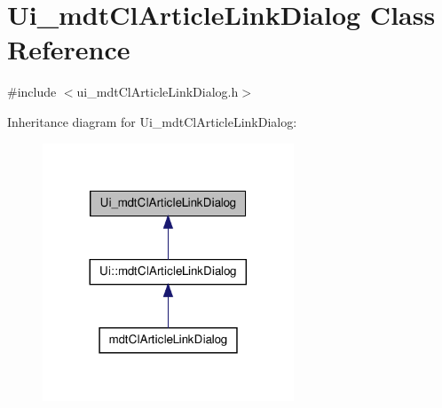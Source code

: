 \hypertarget{class_ui__mdt_cl_article_link_dialog}{\section{Ui\-\_\-mdt\-Cl\-Article\-Link\-Dialog Class Reference}
\label{class_ui__mdt_cl_article_link_dialog}
}


{\ttfamily \#include $<$ui\-\_\-mdt\-Cl\-Article\-Link\-Dialog.\-h$>$}



Inheritance diagram for Ui\-\_\-mdt\-Cl\-Article\-Link\-Dialog\-:\nopagebreak
\begin{figure}[H]
\begin{center}
\leavevmode
\includegraphics[width=212pt]{class_ui__mdt_cl_article_link_dialog__inherit__graph}
\end{center}
\end{figure}


